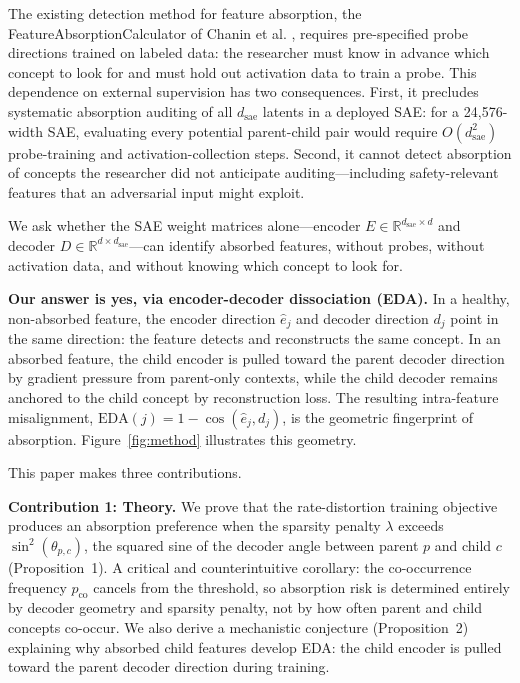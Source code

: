 \documentclass{article}
\begin{document}
The existing detection method for feature absorption, the FeatureAbsorptionCalculator of
Chanin et al. \citeyear{chanin2024absorption}, requires pre-specified probe directions trained
on labeled data: the researcher must know in advance which concept to look for and must hold
out activation data to train a probe. This dependence on external supervision has two
consequences. First, it precludes systematic absorption auditing of all $d_\text{sae}$ latents
in a deployed SAE: for a 24,576-width SAE, evaluating every potential parent-child pair would
require $O(d_\text{sae}^2)$ probe-training and activation-collection steps. Second, it cannot
detect absorption of concepts the researcher did not anticipate auditing---including
safety-relevant features that an adversarial input might exploit.

We ask whether the SAE weight matrices alone---encoder $E \in \mathbb{R}^{d_\text{sae} \times d}$
and decoder $D \in \mathbb{R}^{d \times d_\text{sae}}$---can identify absorbed features,
without probes, without activation data, and without knowing which concept to look for.

\textbf{Our answer is yes, via encoder-decoder dissociation (EDA).} In a healthy, non-absorbed
feature, the encoder direction $\hat{e}_j$ and decoder direction $d_j$ point in the same
direction: the feature detects and reconstructs the same concept. In an absorbed feature,
the child encoder is pulled toward the parent decoder direction by gradient pressure from
parent-only contexts, while the child decoder remains anchored to the child concept by
reconstruction loss. The resulting intra-feature misalignment, $\text{EDA}(j) = 1 -
\cos(\hat{e}_j, d_j)$, is the geometric fingerprint of absorption. Figure~\ref{fig:method}
illustrates this geometry.

This paper makes three contributions.

\textbf{Contribution 1: Theory.} We prove that the rate-distortion training objective produces an
absorption preference when the sparsity penalty $\lambda$ exceeds $\sin^2(\theta_{p,c})$,
the squared sine of the decoder angle between parent $p$ and child $c$ (Proposition~1).
A critical and counterintuitive corollary: the co-occurrence frequency $p_\text{co}$ cancels
from the threshold, so absorption risk is determined entirely by decoder geometry and sparsity
penalty, not by how often parent and child concepts co-occur. We also derive a mechanistic
conjecture (Proposition~2) explaining why absorbed child features develop EDA: the child
encoder is pulled toward the parent decoder direction during training.
\end{document}
